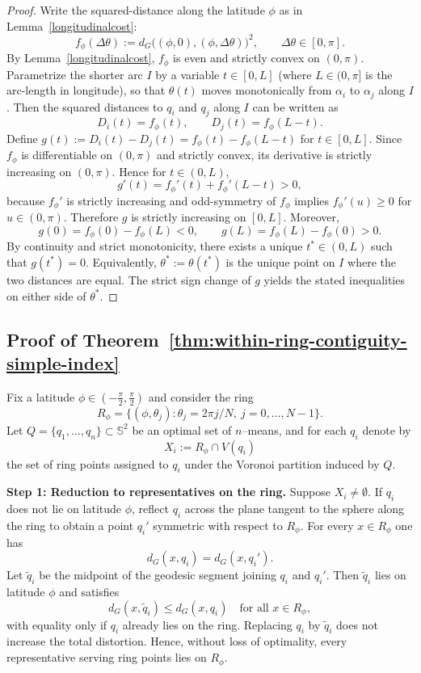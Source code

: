 \documentclass[12pt, reqno]{amsart}
\theoremstyle{plain}
\theoremstyle{definition}
\newcommand{\D}[1]{\mathbb{#1}}%
\begin{document}
\begin{proof}
Write the squared-distance along the latitude $\phi$ as in Lemma~\ref{longitudinalcost}:
\[
f_\phi(\Delta\theta):=d_G\big((\phi,0),(\phi,\Delta\theta)\big)^2,
\qquad \Delta\theta\in[0,\pi].
\]
By Lemma~\ref{longitudinalcost}, $f_\phi$ is even and strictly convex on $(0,\pi)$.
Parametrize the shorter arc $I$ by a variable $t\in[0,L]$ (where $L\in(0,\pi]$ is the arc-length in longitude), so that
$\theta(t)$ moves monotonically from $\alpha_i$ to $\alpha_j$ along $I$.
Then the squared distances to $q_i$ and $q_j$ along $I$ can be written as
\[
D_i(t)=f_\phi(t),\qquad D_j(t)=f_\phi(L-t).
\]
Define $g(t):=D_i(t)-D_j(t)=f_\phi(t)-f_\phi(L-t)$ for $t\in[0,L]$.
Since $f_\phi$ is differentiable on $(0,\pi)$ and strictly convex, its derivative is strictly increasing on $(0,\pi)$.
Hence for $t\in(0,L)$,
\[
g'(t)=f_\phi'(t)+f_\phi'(L-t) > 0,
\]
because $f_\phi'$ is strictly increasing and odd-symmetry of $f_\phi$ implies $f_\phi'(u)\ge 0$ for $u\in(0,\pi)$.
Therefore $g$ is strictly increasing on $[0,L]$.
Moreover,
\[
g(0)=f_\phi(0)-f_\phi(L) < 0,\qquad g(L)=f_\phi(L)-f_\phi(0) > 0.
\]
By continuity and strict monotonicity, there exists a unique $t^\ast\in(0,L)$ such that $g(t^\ast)=0$.
Equivalently, $\theta^\ast:=\theta(t^\ast)$ is the unique point on $I$ where the two distances are equal.
The strict sign change of $g$ yields the stated inequalities on either side of $\theta^\ast$.
\end{proof}

\subsection*{Proof of Theorem~\ref{thm:within-ring-contiguity-simple-index}}
Fix a latitude $\phi\in\left(-\frac{\pi}{2},\frac{\pi}{2}\right)$ and consider the ring
\[
R_\phi=\{(\phi,\theta_j):\theta_j=2\pi j/N,\ j=0,\dots,N-1\}.
\]
Let $Q=\{q_1,\dots,q_n\}\subset \D S^2$ be an optimal set of $n$--means, and for each $q_i$ denote by
\[
X_i:=R_\phi\cap V(q_i)
\]
the set of ring points assigned to $q_i$ under the Voronoi partition induced by $Q$.

\medskip
\noindent\textbf{Step 1: Reduction to representatives on the ring.}
Suppose $X_i\neq\emptyset$.
If $q_i$ does not lie on latitude $\phi$, reflect $q_i$ across the plane tangent to the sphere along the ring to obtain a point $q_i'$ symmetric with respect to $R_\phi$.
For every $x\in R_\phi$ one has
\[
d_G(x,q_i)=d_G(x,q_i').
\]
Let $\tilde q_i$ be the midpoint of the geodesic segment joining $q_i$ and $q_i'$.
Then $\tilde q_i$ lies on latitude $\phi$ and satisfies
\[
d_G(x,\tilde q_i)\le d_G(x,q_i)\quad\text{for all }x\in R_\phi,
\]
with equality only if $q_i$ already lies on the ring.
Replacing $q_i$ by $\tilde q_i$ does not increase the total distortion.
Hence, without loss of optimality, every representative serving ring points lies on $R_\phi$.
\end{document}
